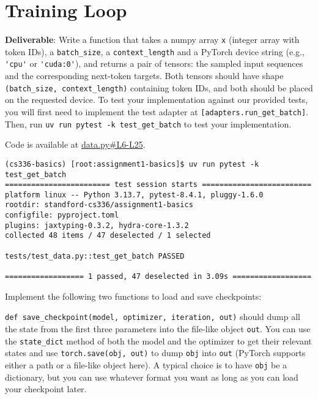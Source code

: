 \section{Training Loop}


\textbf{Deliverable}: Write a function that takes a numpy array \lstinline{x} (integer array with token IDs), a \lstinline{batch_size}, a \lstinline{context_length} and a PyTorch device string (e.g., \lstinline{'cpu'} or \lstinline{'cuda:0'}), and returns a pair of tensors: the sampled input sequences and the corresponding next-token targets. Both tensors should have shape \lstinline{(batch_size, context_length)} containing token IDs, and both should be placed on the requested device. To test your implementation against our provided tests, you will first need to implement the test adapter at \lstinline{[adapters.run_get_batch]}. Then, run \lstinline{uv run pytest -k test_get_batch} to test your implementation.

\begin{answer}
    Code is available at \href{https://github.com/donglinkang2021/assignment1-basics/blob/main/cs336_basics/data.py#L6-L25}{data.py\#L6-L25}.
\end{answer}

\begin{lstlisting}
(cs336-basics) [root:assignment1-basics]$ uv run pytest -k test_get_batch
======================== test session starts =========================
platform linux -- Python 3.13.7, pytest-8.4.1, pluggy-1.6.0
rootdir: standford-cs336/assignment1-basics
configfile: pyproject.toml
plugins: jaxtyping-0.3.2, hydra-core-1.3.2
collected 48 items / 47 deselected / 1 selected                      

tests/test_data.py::test_get_batch PASSED

================== 1 passed, 47 deselected in 3.09s ==================
\end{lstlisting}


Implement the following two functions to load and save checkpoints:

\texttt{def save\_checkpoint(model, optimizer, iteration, out)} should dump all the state from the first three parameters into the file-like object \texttt{out}. You can use the \texttt{state\_dict} method of both the model and the optimizer to get their relevant states and use \texttt{torch.save(obj, out)} to dump \texttt{obj} into \texttt{out} (PyTorch supports either a path or a file-like object here). A typical choice is to have \texttt{obj} be a dictionary, but you can use whatever format you want as long as you can load your checkpoint later.

